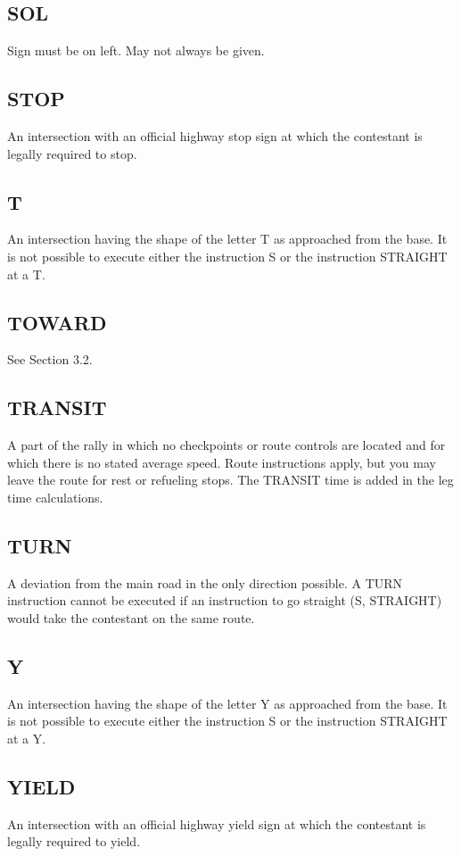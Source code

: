 \subsection{SOL}
Sign must be on left. May not always be given.

\subsection{STOP}
An intersection with an official highway stop
sign at which the contestant is legally required to stop.

\subsection{T}
An intersection having the shape of the letter T as approached from the base. It is not possible to execute either the instruction S or the instruction STRAIGHT at a T.

\subsection{TOWARD} See Section 3.2.

\subsection{TRANSIT}
A part of the rally in which no checkpoints or route controls are located and for which there is no stated average speed. Route instructions apply, but you may leave the route for rest or refueling stops. The TRANSIT time is added in the leg time calculations.

\subsection{TURN}
A deviation from the main road in the only direction possible. A TURN instruction cannot be executed if an instruction to go straight (S, STRAIGHT) would take the contestant on the same route.
\subsection{Y}
An intersection having the shape of the letter Y as approached from the base. It is not possible to execute either the instruction S or the instruction STRAIGHT at a Y.

\subsection{YIELD}
An intersection with an official highway yield sign at which the contestant is legally required to yield.